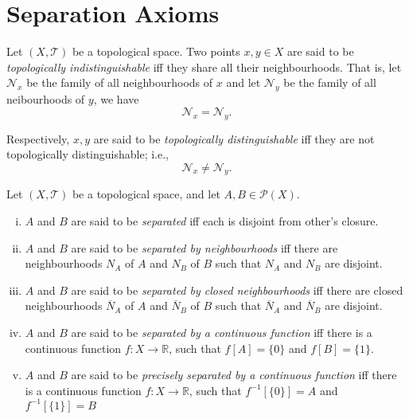 \section{Separation Axioms}

\begin{definition}
	\label{def: topologically indistinguishable}
	Let $(X, \mathcal T)$ be a topological space. Two points $x,y \in X$ are said to be \textit{topologically indistinguishable} iff they share all their neighbourhoods. That is, let $\mathcal N_x$ be the family of all neighbourhoods of $x$ and let $\mathcal N_y$ be the family of all neibourhoods of $y$, we have
	$$
	\mathcal N_x = \mathcal N_y.
	$$
	
	Respectively, $x,y$ are said to be \textit{topologically distinguishable} iff they are not topologically distinguishable; i.e.,
	$$
	\mathcal N_x \ne \mathcal N_y.
	$$
\end{definition}


\begin{definition}
	Let $(X, \mathcal T)$ be a topological space, and let $A, B \in \mathcal P(X)$.
	
	\begin{enumerate}[(i)]
		\item $A$ and $B$ are said to be \textit{separated} iff each is disjoint from other's closure.
		\item $A$ and $B$ are said to be \textit{separated by neighbourhoods} iff there are neighbourhoods $N_A$ of $A$ and $N_B$ of $B$ such that $N_A$ and $N_B$ are disjoint.
		\item $A$ and $B$ are said to be \textit{separated by closed neighbourhoods} iff there are closed neighbourhoods $\overline N_A$ of $A$ and $\overline N_B$ of $B$ such that $\overline N_A$ and $\overline N_B$ are disjoint.
		\item $A$ and $B$ are said to be \textit{separated by a continuous function} iff there is a continuous function $f: X \to \mathbb R$, such that $f[A] = \{0\}$ and $f[B] = \{1\}$.
		\item $A$ and $B$ are said to be \textit{precisely separated by a continuous function} iff there is a continuous function $f: X \to \mathbb R$, such that $f^{-1}[\{0\}] = A$ and $f^{-1}[\{1\}] = B$
	\end{enumerate}
\end{definition}


